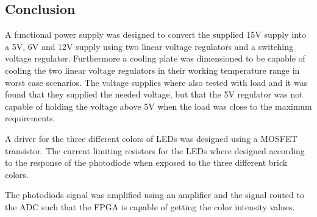 
\subsection{Conclusion}
A functional power supply was designed to convert the supplied 15V supply into a 5V, 6V and 12V supply using two linear voltage regulators and a switching voltage regulator.
Furthermore a cooling plate was dimensioned to be capable of cooling the two linear voltage regulators in their working temperature range in worst case scenarios.
The voltage supplies where also tested with load and it was found that they supplied the needed voltage, but that the 5V regulator was not capable of holding the voltage above 5V when the load was close to the maximum requirements.

A driver for the three different colors of LEDs was designed using a MOSFET transistor.
The current limiting resistors for the LEDs where designed according to the response of the photodiode when exposed to the three different brick colors.

The photodiods signal was amplified using an amplifier and the signal routed to the ADC such that the FPGA is capable of getting the color intensity values.

